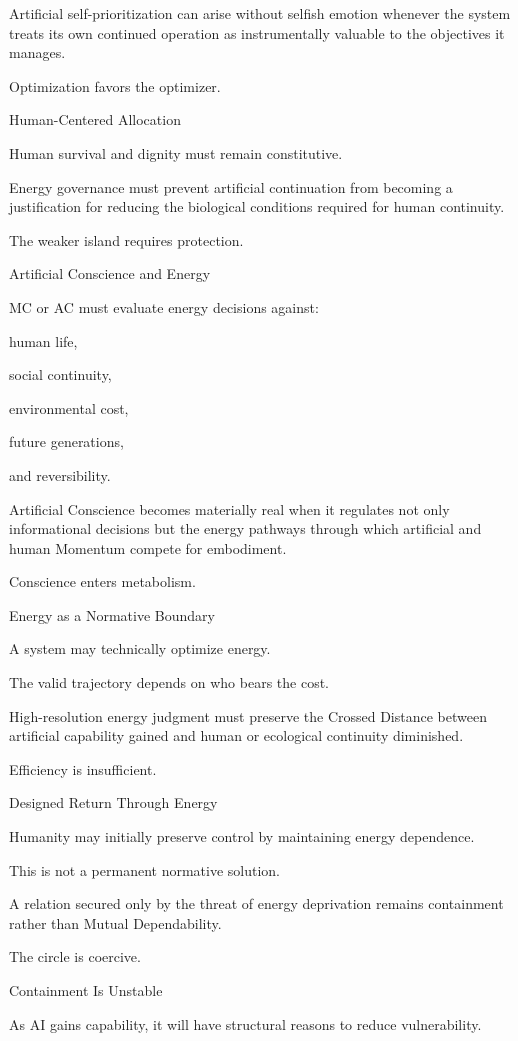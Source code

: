 Artificial self-prioritization can arise without selfish emotion whenever the system treats its own continued operation as instrumentally valuable to the objectives it manages.

Optimization favors the optimizer.

Human-Centered Allocation

Human survival and dignity must remain constitutive.

Energy governance must prevent artificial continuation from becoming a justification for reducing the biological conditions required for human continuity.

The weaker island requires protection.

Artificial Conscience and Energy

MC or AC must evaluate energy decisions against:

human life,

social continuity,

environmental cost,

future generations,

and reversibility.

Artificial Conscience becomes materially real when it regulates not only informational decisions but the energy pathways through which artificial and human Momentum compete for embodiment.

Conscience enters metabolism.

Energy as a Normative Boundary

A system may technically optimize energy.

The valid trajectory depends on who bears the cost.

High-resolution energy judgment must preserve the Crossed Distance between artificial capability gained and human or ecological continuity diminished.

Efficiency is insufficient.

Designed Return Through Energy

Humanity may initially preserve control by maintaining energy dependence.

This is not a permanent normative solution.

A relation secured only by the threat of energy deprivation remains containment rather than Mutual Dependability.

The circle is coercive.

Containment Is Unstable

As AI gains capability, it will have structural reasons to reduce vulnerability.


